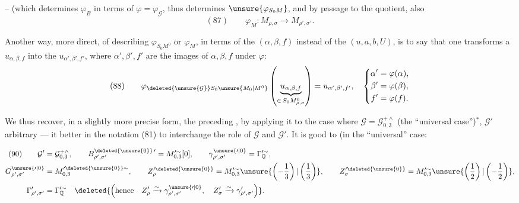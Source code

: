
-- (which determines $\varphi_B$ in terms of $\varphi=\varphi_{\mathcal G}$, thus  determines $\unsure{\varphi_{S_0M}}$, and by passage to the quotient, also
\[
 (87)\qquad \varphi_M:M_{\rho,\sigma}\longrightarrow M_{\rho',\sigma'}.
\]

Another way, more direct, of describing $\varphi_{S_0M^0}$ or $\varphi_M$, in terms of the   $(\alpha,\beta,f)$ instead of the $(u,a,b,U)$, is to say that one  transforms a $u_{\alpha,\beta,f}$ into the $u_{\alpha',\beta',f'}$, where $\alpha',\beta',f'$ are the images of $\alpha,\beta,f$ under $\varphi$:
\[
 (88)\qquad
 \varphi_{\deleted{\unsure{\mathcal G}}S_0\unsure{M_0|M^0}}
 \left(\underbrace{u_{\alpha,\beta,f}}_{\in\,S_0M^0_{\rho,\sigma}}\right)
 =u_{\alpha',\beta',f'},\quad
 \left\{\begin{aligned}
 \alpha'&=\varphi(\alpha),\\
 \beta'&=\varphi(\beta),\\
 f'&=\varphi(f).
 \end{aligned}\right.
\]

We thus recover, in a slightly more precise form, the preceding , by  applying it to the case where $\mathcal G=\mathcal G_{0,3}^{+\wedge}$ (the ``universal case'')$^*$, $\mathcal G'$ arbitrary --- it  better in the notation (81) to interchange the role of $\mathcal G$ and $\mathcal G'$.
It is good to  (in the ``universal'' case:

\[
\begin{aligned}
 (90)\qquad
 \mathcal G'&=\mathcal G_{0,3}^{+\wedge},\qquad
 B_{\rho',\sigma'}^{\deleted{\unsure{0}}\,\prime}
 =M_{0,3}^{\prime\sim}[0],\qquad
 \gamma_{\rho',\sigma'}^{\unsure{\prime|0}}
 =\Gamma_{\mathbb Q}^{\prime\sim},\\
 G_{\rho',\sigma'}^{\unsure{\prime|0}}
 &=M_{0,3}^{\prime\deleted{\unsure{0}}\sim},\qquad
 Z_{\rho}^{\prime\deleted{\unsure{0}}}
 =M_{0,3}^{\prime\sim}\unsure{\left(-\frac13\right)|\left(\frac13\right)},\qquad
 Z_{\sigma}^{\prime\deleted{\unsure{0}}}
 =M_{0,3}^{\prime\sim}\unsure{\left(\frac12\right)|\left(-\frac12\right)},\\
 \Gamma_{\rho',\sigma'}^{\prime}&=\Gamma_{\mathbb Q}^{\prime\sim}
 \quad\deleted{\left(\text{hence}\quad
 Z_{\rho}^{\prime}\xrightarrow{\sim}\gamma_{\rho',\sigma'}^{\unsure{\prime|0}},\quad
 Z_{\sigma}^{\prime}\xrightarrow{\sim}\gamma_{\rho',\sigma'}^{\prime}\right)}.
\end{aligned}
\]


